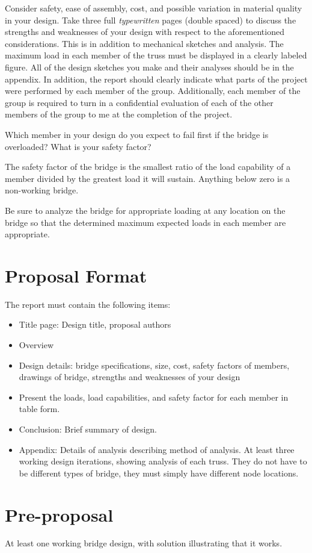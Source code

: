 \documentclass[11pt]{article}
\begin{document}
Consider safety, ease of assembly, cost, and possible variation in material quality in your design.  Take three full \emph{typewritten} pages (double spaced) to discuss the strengths and weaknesses of your design with respect to the aforementioned considerations.  This is in addition to mechanical sketches and analysis.  The maximum load in each member of the truss must be displayed in a clearly labeled figure.  All of the design sketches you make and their analyses should be in the appendix.  In addition, the report should clearly indicate what parts of the project were performed by each member of the group.  Additionally, each member of the group is required to turn in a confidential evaluation of each of the other members of the group to me at the completion of the project.

Which member in your design do you expect to fail first if the bridge is overloaded?  What is your safety factor?

The safety factor of the bridge is the smallest ratio of the load capability of a member divided by the greatest load it will sustain. Anything below zero is a non-working bridge.

Be sure to analyze the bridge for appropriate loading at any location on the bridge so that the determined maximum expected loads in each member are appropriate.

\section*{Proposal Format}

The report must contain the following items:
\begin{itemize}
\item Title page: Design title, proposal authors
\item Overview 
\item Design details: bridge specifications, size, cost, safety 
factors of members, drawings of bridge, strengths and weaknesses of 
your design
\item Present the loads, load capabilities, and safety factor for 
each member in table form.
\item Conclusion: Brief summary of design. 
\item Appendix: Details of analysis describing method of analysis. At 
least three working design iterations, showing analysis of each 
truss. They do not have to be different types of bridge, they must 
simply have different node locations.
\end{itemize}


\section*{Pre-proposal}
At least one working bridge design, with solution illustrating that it works.
\end{document}
